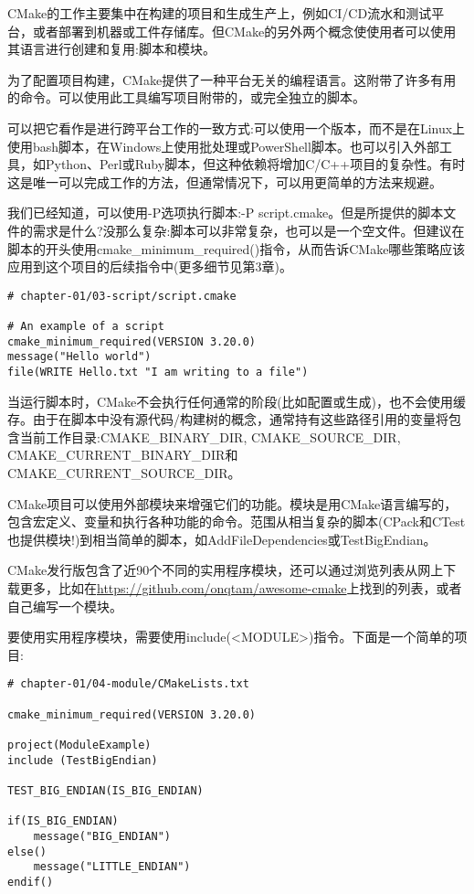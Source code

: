 
CMake的工作主要集中在构建的项目和生成生产上，例如CI/CD流水和测试平台，或者部署到机器或工件存储库。但CMake的另外两个概念使使用者可以使用其语言进行创建和复用:脚本和模块。


为了配置项目构建，CMake提供了一种平台无关的编程语言。这附带了许多有用的命令。可以使用此工具编写项目附带的，或完全独立的脚本。
 
可以把它看作是进行跨平台工作的一致方式:可以使用一个版本，而不是在Linux上使用bash脚本，在Windows上使用批处理或PowerShell脚本。也可以引入外部工具，如Python、Perl或Ruby脚本，但这种依赖将增加C/C++项目的复杂性。有时这是唯一可以完成工作的方法，但通常情况下，可以用更简单的方法来规避。

我们已经知道，可以使用-P选项执行脚本:-P script.cmake。但是所提供的脚本文件的需求是什么?没那么复杂:脚本可以非常复杂，也可以是一个空文件。但建议在脚本的开头使用cmake\_minimum\_required()指令，从而告诉CMake哪些策略应该应用到这个项目的后续指令中(更多细节见第3章)。

\begin{lstlisting}[style=styleCMake]	
# chapter-01/03-script/script.cmake
	
# An example of a script
cmake_minimum_required(VERSION 3.20.0)
message("Hello world")
file(WRITE Hello.txt "I am writing to a file")
\end{lstlisting}

当运行脚本时，CMake不会执行任何通常的阶段(比如配置或生成)，也不会使用缓存。由于在脚本中没有源代码/构建树的概念，通常持有这些路径引用的变量将包含当前工作目录:CMAKE\_BINARY\_DIR, CMAKE\_SOURCE\_DIR, CMAKE\_CURRENT\_BINARY\_DIR和CMAKE\_CURRENT\_SOURCE\_DIR。


CMake项目可以使用外部模块来增强它们的功能。模块是用CMake语言编写的，包含宏定义、变量和执行各种功能的命令。范围从相当复杂的脚本(CPack和CTest也提供模块!)到相当简单的脚本，如AddFileDependencies或TestBigEndian。

CMake发行版包含了近90个不同的实用程序模块，还可以通过浏览列表从网上下载更多，比如在\url{https://github.com/onqtam/awesome-cmake}上找到的列表，或者自己编写一个模块。

要使用实用程序模块，需要使用include(<MODULE>)指令。下面是一个简单的项目:

\begin{lstlisting}[style=styleCMake]	
# chapter-01/04-module/CMakeLists.txt
	
cmake_minimum_required(VERSION 3.20.0)

project(ModuleExample)
include (TestBigEndian)

TEST_BIG_ENDIAN(IS_BIG_ENDIAN)

if(IS_BIG_ENDIAN)
	message("BIG_ENDIAN")
else()
	message("LITTLE_ENDIAN")
endif()
\end{lstlisting}

